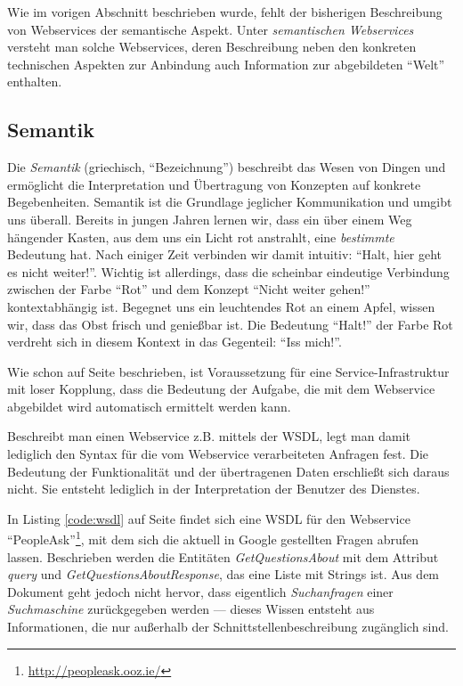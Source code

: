 Wie im vorigen Abschnitt beschrieben wurde, fehlt der bisherigen Beschreibung von Webservices der semantische Aspekt. Unter \emph{semantischen Webservices} versteht man solche Webservices, deren Beschreibung neben den konkreten technischen Aspekten zur Anbindung auch Information zur abgebildeten "`Welt"' enthalten.

\subsection{Semantik}

Die \emph{Semantik} (griechisch, "`Bezeichnung"') beschreibt das Wesen von Dingen und ermöglicht die Interpretation und Übertragung von Konzepten auf konkrete Begebenheiten. Semantik ist die Grundlage jeglicher Kommunikation und umgibt uns überall. Bereits in jungen Jahren lernen wir, dass ein über einem Weg hängender Kasten, aus dem uns ein Licht rot anstrahlt, eine \emph{bestimmte} Bedeutung hat. Nach einiger Zeit verbinden wir damit intuitiv: "`Halt, hier geht es nicht weiter!"'. Wichtig ist allerdings, dass die scheinbar eindeutige Verbindung zwischen der Farbe "`Rot"' und dem Konzept "`Nicht weiter gehen!"' kontextabhängig ist. Begegnet uns ein leuchtendes Rot an einem Apfel, wissen wir, dass das Obst frisch und genießbar ist. Die Bedeutung "`Halt!"' der Farbe Rot verdreht sich in diesem Kontext in das Gegenteil: "`Iss mich!"'.

Wie schon auf Seite \pageref{l:intro-loosecoupling} beschrieben, ist Voraussetzung für eine Service-Infrastruktur mit loser Kopplung, dass die Bedeutung der Aufgabe, die mit dem Webservice abgebildet wird automatisch ermittelt werden kann.

Beschreibt man einen Webservice z.B. mittels der \ac{WSDL}, legt man damit lediglich den Syntax für die vom Webservice verarbeiteten Anfragen fest. Die Bedeutung der Funktionalität und der übertragenen Daten erschließt sich daraus nicht. Sie entsteht lediglich in der Interpretation der Benutzer des Dienstes. 

In Listing \ref{code:wsdl} auf Seite \pageref{code:wsdl} findet sich eine \ac{WSDL} für den Webservice "`PeopleAsk"'\footnote{\url{http://peopleask.ooz.ie/}}, mit dem sich die aktuell in Google gestellten Fragen abrufen lassen. Beschrieben werden die Entitäten \emph{GetQuestionsAbout} mit dem Attribut \emph{query} und \emph{GetQuestionsAboutResponse}, das eine Liste mit Strings ist. Aus dem Dokument geht jedoch nicht hervor, dass eigentlich \emph{Suchanfragen} einer \emph{Suchmaschine} zurückgegeben werden --- dieses Wissen entsteht aus Informationen, die nur außerhalb der Schnittstellenbeschreibung zugänglich sind.

